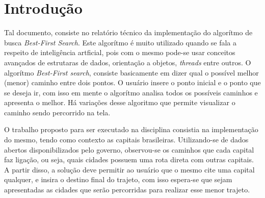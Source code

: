 \chapter*[Introdução]{Introdução}

Tal documento, consiste no relatório técnico da implementação do algorítmo de busca \textit{Best-First
Search}. Este algorítmo é muito utilizado quando se fala a respeito de inteligência artficial, pois com o 
mesmo pode-se usar conceitos avançados de estrutaras de dados, orientação a objetos, \textit{threads} 
entre outros. O algorítmo \textit{Best-First search}, consiste basicamente em dizer qual o possível melhor 
(menor) caminho entre dois pontos. O usuário insere o ponto inicial e o ponto que se deseja ir, com isso 
em mente o algorítmo analisa todos os possíveis caminhos e apresenta o melhor. Há variações desse 
algoritmo que permite visualizar o caminho sendo percorrido na tela.

O trabalho proposto para ser executado na disciplina consistia na implementação do mesmo, tendo como 
contexto as capitais brasileiras. Utilizando-se de dados abertos disponibilizados pelo governo, observou-se 
os caminhos que cada capital faz ligação, ou seja, quais cidades possuem uma rota direta com outras capitais. A partir disso, a solução deve permitir ao usuário que o mesmo cite uma capital qualquer, e insira o destino final do trajeto, com isso espera-se que sejam apresentadas as cidades que serão percorridas para realizar esse menor trajeto.